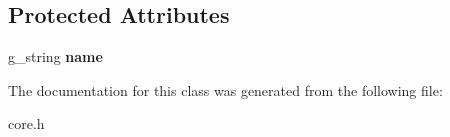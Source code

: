 \subsection*{Protected Attributes}
\begin{DoxyCompactItemize}
\item 
\hypertarget{classCore_af9a530c13a24af172b2430b9b53ee7e3}{g\-\_\-string {\bfseries name}}\label{classCore_af9a530c13a24af172b2430b9b53ee7e3}

\end{DoxyCompactItemize}


The documentation for this class was generated from the following file\-:\begin{DoxyCompactItemize}
\item 
core.\-h\end{DoxyCompactItemize}
